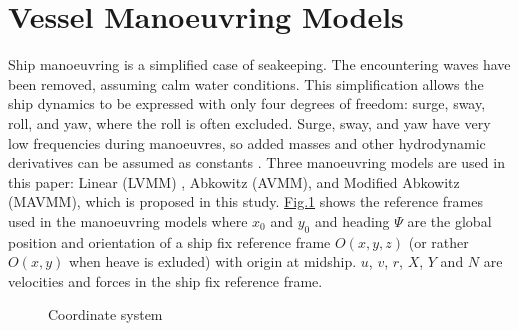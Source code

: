 \documentclass[review]{elsarticle}
\let\sphinxpxdimen\pdfpxdimen\else\newdimen\sphinxpxdimen
\begin{document}
\section{Vessel Manoeuvring Models}
\label{\detokenize{02.01_VMMs:vessel-manoeuvring-models}}\label{\detokenize{02.01_VMMs:vmm}}\label{\detokenize{02.01_VMMs::doc}}
\sphinxAtStartPar
Ship manoeuvring is a simplified case of seakeeping. The encountering waves have been removed, assuming calm water conditions. This simplification allows the ship dynamics to be expressed with only four degrees of freedom: surge, sway, roll, and yaw, where the roll is often excluded. Surge, sway, and yaw have very low frequencies during manoeuvres, so added masses and other hydrodynamic derivatives can be assumed as constants  \cite{fossen_handbook_2021}. Three manoeuvring models are used in this paper: Linear (LVMM) \cite{matusiak_dynamics_2017}, Abkowitz (AVMM), \cite{abkowitz_ship_1964} and Modified Abkowitz (MAVMM), which is proposed in this study.
\hyperref[\detokenize{02.01_VMMs:coordinate-system}]{Fig.\@ \ref{\detokenize{02.01_VMMs:coordinate-system}}} shows the reference frames used in the manoeuvring models where \(x_0\) and \(y_0\) and heading \(\Psi\) are the global position and orientation of a ship fix reference frame \(O(x,y,z)\) (or rather \(O(x,y)\) when heave is exluded) with origin at midship. \(u\), \(v\), \(r\), \(X\), \(Y\) and \(N\) are velocities and forces in the ship fix reference frame.

\begin{figure}[H]
\centering
\capstart

\noindent\sphinxincludegraphics[height=300\sphinxpxdimen]{{coordinate_system}.PNG}
\caption{Coordinate system}\label{\detokenize{02.01_VMMs:coordinate-system}}\end{figure}
\end{document}
